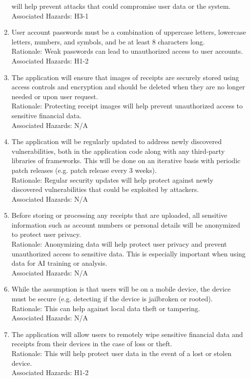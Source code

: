 \documentclass{article}
\begin{document}
\begin{enumerate}[label=SR\arabic*]
    will help prevent attacks that could compromise user data or the system.
    \\Associated Hazards: H3-1
	\item User account passwords must be a combination of uppercase letters,
	lowercase letters, numbers, and symbols, and be at least 8 characters
	long.\\Rationale: Weak passwords can lead to unauthorized access to user
	accounts.\\Associated Hazards: H1-2
    \item The application will ensure that images of receipts are securely stored
    using access controls and encryption and should be deleted when they are no
    longer needed or upon user request. \\Rationale: Protecting receipt images
    will help prevent unauthorized access to sensitive financial data.\\Associated
    Hazards: N/A
	\item The application will be regularly updated to address newly discovered
	vulnerabilities, both in the application code along with any third-party
	libraries of frameworks. This will be done on an iterative basis with
	periodic patch releases (e.g. patch release every 3 weeks). \\Rationale:
	Regular security updates will help protect against newly discovered
	vulnerabilities that could be exploited by attackers.\\Associated Hazards:
	N/A
	\item Before storing or processing any receipts that are uploaded, all
	sensitive information such as account numbers or personal details will be
	anonymized to protect user privacy. \\Rationale: Anonymizing data will help
	protect user privacy and prevent unauthorized access to sensitive data. This
	is especially important when using data for AI training or analysis.
	\\Associated Hazards: N/A
	\item While the assumption is that users will be on a mobile device, the
	device must be secure (e.g. detecting if the device is jailbroken or
	rooted). \\Rationale: This can help against local data
	theft or tampering. \\Associated Hazards: N/A
    \item The application will allow users to remotely wipe sensitive financial
	data and receipts from their devices in the case of loss or theft.
	\\Rationale: This will help protect user data in the event of a lost or
    stolen device.  \\Associated Hazards: H1-2
\end{enumerate}
\end{document}
